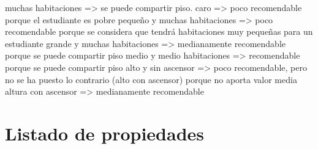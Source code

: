 \documentclass[12pt]{report} %
\begin{document}
    muchas habitaciones => se puede compartir piso.
    caro => poco recomendable porque el estudiante es pobre
    pequeño y muchas habitaciones => poco recomendable porque se considera que tendrá habitaciones muy pequeñas para un estudiante
    grande y muchas habitaciones => medianamente recomendable porque se puede compartir piso
    medio y medio habitaciones => recomendable porque se puede compartir piso
    alto y sin ascensor => poco recomendable, pero no se ha puesto lo contrario (alto con ascensor) porque no aporta valor
    media altura con ascensor => medianamente recomendable

    \chapter{Listado de propiedades}
    \label{chap:propiedades}
\end{document}
